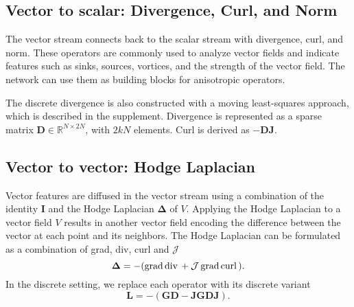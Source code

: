 \documentclass[acmtog, authorversion]{acmart}
\begin{document}
\subsection{Vector to scalar: Divergence, Curl, and Norm}
The vector stream connects back to the scalar stream with divergence, curl, and norm. These operators are commonly used to analyze vector fields and indicate features such as sinks, sources, vortices, and the strength of the vector field. The network can use them as building blocks for anisotropic operators.

The discrete divergence is also constructed with a moving least-squares approach, which is described in the supplement. Divergence is represented as a sparse matrix $\mathbf{D} \in \mathbb{R}^{N \times 2N}$, with $2kN$ elements. Curl is derived as $-\mathbf{DJ}$.

\subsection{Vector to vector: Hodge Laplacian}
Vector features are diffused in the vector stream using a combination of the identity $\mathbf{I}$ and the Hodge Laplacian $\bm{\Delta}$ of $V$.
Applying the Hodge Laplacian to a vector field $V$ results in another vector field encoding the difference between the vector at each point and its neighbors. The Hodge Laplacian can be formulated as a combination of grad, div, curl and $\mathcal{J}$~\cite{Brandt2017}
\begin{equation}
    \bm{\Delta} = -(\text{grad\,} \text{div\,} + \mathcal{J}\text{\,grad\,} \text{curl\,}).
\end{equation}
In the discrete setting, we replace each operator with its discrete variant
\begin{equation}
    \mathbf{L} = -(\mathbf{GD} - \mathbf{JGDJ}).
\end{equation}
\end{document}
